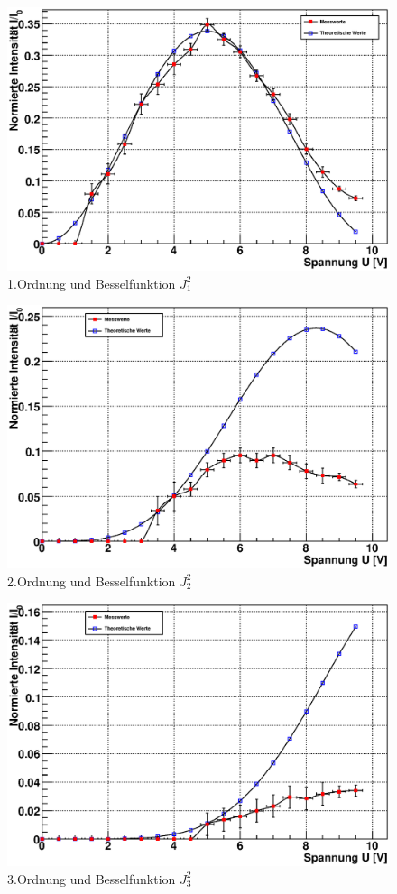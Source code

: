 \documentclass[12pt]{article}
\begin{document}
\begin{figure}[H]  
\centering
\includegraphics[width=0.9\linewidth]{pictures/raman1o.eps}
\caption{1.Ordnung und Besselfunktion $J^2_1$}
\end{figure}

\begin{figure}[H]  
\centering
\includegraphics[width=0.9\linewidth]{pictures/raman2o.eps}
\caption{2.Ordnung und Besselfunktion $J^2_2$}
\end{figure}

\begin{figure}[H]  
\centering
\includegraphics[width=0.9\linewidth]{pictures/raman3o.eps}
\caption{3.Ordnung und Besselfunktion $J^2_3$}
\end{figure}
\end{document}
